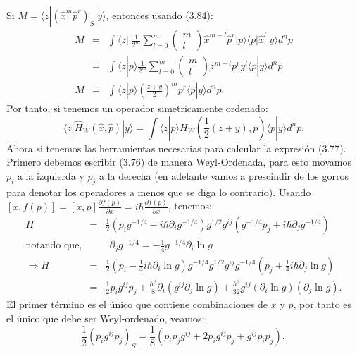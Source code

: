 Si $M=\langle z|(\hat{x}^{m}\hat{p}^{r})_{S}|y\rangle $, entonces usando (3.84):
\begin{eqnarray}
\nonumber M&=&\int\langle z||\frac{1}{2^{m}}\sum_{l=0}^{m}\left(\begin{array}{c}
m\\
l
\end{array}\right)\hat{x}^{m-l}\hat{p}^{r}|p\rangle\langle p|\hat{x}^{l}|y\rangle d^{n}p\\
\nonumber &=&\int\langle z|p\rangle\frac{1}{2^{m}}\sum_{l=0}^{m}\left(\begin{array}{c}
m\\
l
\end{array}\right)z^{m-l}p^{r}y^{l}\langle p|y\rangle d^{n}p\\
M&=&\int\langle z|p\rangle\left(\frac{z+y}{2}\right)^{m}p^{r}\langle p|y\rangle d^{n}p .
\end{eqnarray}
Por tanto, si tenemos un operador simetricamente ordenado:
\begin{equation}
\langle z|\hat{H}_{W}(\hat{x},\hat{p})|y\rangle=\int\langle z|p\rangle H_{W}\left(\frac{1}{2}(z+y),p\right)\langle p|y\rangle d^{n}p.
\end{equation} 
Ahora si tenemos las herramientas necesarias para calcular la expresión (3.77). Primero debemos escribir (3.76) de manera Weyl-Ordenada, para esto movamos $p_i$ a la izquierda y $p_j$ a la derecha (en adelante vamos a prescindir de los gorros para denotar los operadores a menos que se diga lo contrario). Usando $[x,f(p)]=[x,p]\frac{\partial f(p)}{\partial x}=i\hbar\frac{\partial f(p)}{\partial x}$, tenemos:
\begin{eqnarray}
\nonumber H&=&\frac{1}{2}\left(p_{i}g^{-1/4}-i\hbar\partial_{i}g^{-1/4}\right)g^{1/2}g^{ij}\left(g^{-1/4}p_{j}+i\hbar\partial_{j}g^{-1/4}\right)\\
\nonumber \text{notando que,}&&\ \ \partial_{j}g^{-1/4}=-\frac{1}{4}g^{-1/4}\partial_{i}\ln g\\
\nonumber\Rightarrow H &=&\frac{1}{2}\left(p_{i}-\frac{1}{4}i\hbar\partial_{i}\ln g\right)g^{-1/4}g^{1/2}g^{ij}g^{-1/4}\left(p_{j}+\frac{1}{4}i\hbar\partial_{j}\ln g\right)\\
&=&\frac{1}{2}p_{i}g^{ij}p_{j}+\frac{\hbar^{2}}{8}\partial_{i}(g^{ij}\partial_j\ln g)+\frac{\hbar^{2}}{32}g^{ij}(\partial_{i}\ln g)(\partial_{j}\ln g).
\end{eqnarray}
El primer término es el único que contiene combinaciones de $x$ y $p$, por tanto es el único que debe ser Weyl-ordenado, veamos:
\begin{equation}
\frac{1}{2}(p_{i}g^{ij}p_{j})_{S}=\frac{1}{8}(p_{i}p_{j}g^{ij}+2p_{i}g^{ij}p_{j}+g^{ij}p_{i}p_{j}),
\end{equation}
